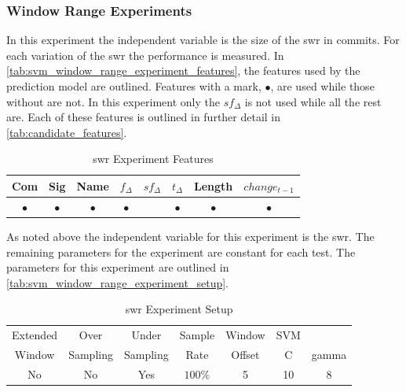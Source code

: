 \subsubsection{Window Range Experiments}
\label{sec:svm_swr_experiment}


In this experiment the independent variable is the size of the \gls{swr} in commits. For each variation of the \gls{swr} the performance is measured. In \autoref{tab:svm_window_range_experiment_features}, the features used by the prediction model are outlined. Features with a mark, $\bullet$, are used while those without are not. In this experiment only the $sf_{\Delta}$ is not used while all the rest are. Each of these features is outlined in further detail in \autoref{tab:candidate_features}.

\begin{table}[h]
\begin{center}

    \begin{tabular}{|c|c|c|c|c|c|c|c|}
        \hline
        Com & Sig & Name & $f_{\Delta}$ & $sf_{\Delta}$ & $t_\Delta$ & Length & $change_{t-1}$ \\
        \hline
        $\bullet$ & $\bullet$ & $\bullet$ & $\bullet$ & & $\bullet$ & $\bullet$ & $\bullet$ \\ \hline
    \end{tabular}
    \caption{\gls{swr} Experiment Features}
    \label{tab:svm_window_range_experiment_features}
\end{center}
\end{table}


As noted above the independent variable for this experiment is the \gls{swr}. The remaining parameters for the experiment are constant for each test. The parameters for this experiment are outlined in \autoref{tab:svm_window_range_experiment_setup}.

\begin{table}[h]
\begin{center}

    \begin{tabular}{|c|c|c|c|c|cc|}
        \hline
        Extended & Over & Under & Sample & Window & SVM & \\
        Window & Sampling & Sampling & Rate & Offset & C & gamma \\ \hline
        No & No & Yes & $100\%$ & 5 & 10 & 8 \\ \hline
    \end{tabular}
    \caption{\gls{swr} Experiment Setup}
    \label{tab:svm_window_range_experiment_setup}
\end{center}

\end{table}

